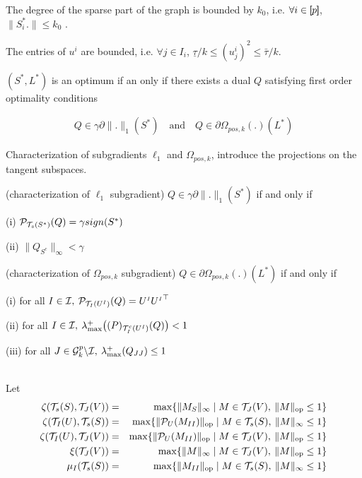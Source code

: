 \documentclass[letterpaper]{article}
\begin{document}
\begin{assumption}The degree of the sparse part of the graph is bounded by $k_0$, i.e. $\forall i\in[\!\![p]\!\!]$,  $\|S^*_i.\|\leq k_0$ .
\end{assumption}

\begin{assumption}The entries of $u^i$ are bounded, i.e. $\forall j\in I_i$,  $\underline{\tau} / k \leq (u_j^i)^2 \leq \bar{\tau} / k$.
\end{assumption}

$(S^*, L^*)$ is an optimum if an only if there exists a dual $Q$ satisfying first order optimality conditions

\begin{align*}
Q\in \gamma \partial \|.\|_1(S^*) \quad \text{and} \quad Q\in \partial \Omega_{pos,k}(.)(L^*)
\end{align*}

Characterization of subgradients $\ell_1$ and $\Omega_{pos,k}$, introduce the projections on the tangent subspaces.

\begin{lemma}(characterization of $\ell_1$ subgradient) $Q\in \gamma \partial \|.\|_1(S^*)$ if and only if
\item[(i)] $\mathcal{P}_{\mathcal{T}_s(S^*)}(Q)=\gamma sign(S^*)$
\item[(ii)] $\|Q_{S^c}\|_{\infty}<\gamma$
\end{lemma}

\begin{lemma}(characterization of $\Omega_{pos,k}$ subgradient) $Q\in \partial \Omega_{pos,k}(.)(L^*)$ if and only if
\item[(i)] for all $I \in \mathcal{I},\:\mathcal{P}_{\mathcal{T}_I(U^{{\scriptscriptstyle I}})}(Q)=U^{{\scriptscriptstyle I}}{U^{{\scriptscriptstyle I}}}^\top$
\item[(ii)] for all $I \in \mathcal{I},\:\lambda_{\max}^+\big (\mathcal(P)_{\mathcal{T}_I^c(U^{{\scriptscriptstyle I}})}(Q) \big )<1$
\item[(iii)] for all $J \in \mathcal{G}^p_k \backslash \mathcal{I}, \: \lambda_{\max}^+(Q_{JJ})\leq 1$
\end{lemma}

\\

Let 
\begin{eqnarray*}
\zeta(\mathcal{T}_s(S),\mathcal{T}_J(V))&=&\max \{ {\|M_S\|_\infty} \mid M \in \mathcal{T}_J(V), \: \|M\|_{{\rm op}}\leq 1\}\\
\zeta(\mathcal{T}_I(U),\mathcal{T}_s(S))&=&\max \{ {\|\mathcal{P}_{U}(M_{II})\|_{{\rm op}}} \mid M \in \mathcal{T}_s(S), \: \|M\|_{\infty}\leq 1\}\\
\zeta(\mathcal{T}_I(U),\mathcal{T}_J(V))&=&\max \{ {\|\mathcal{P}_{U}(M_{II})\|_{{\rm op}}} \mid  M \in \mathcal{T}_J(V), \: \|M\|_{{\rm op}}\leq 1\}\\
\xi(\mathcal{T}_J(V))&=&\max \{ {\|M\|_\infty} \mid M \in \mathcal{T}_J(V), \: \|M\|_{{\rm op}}\leq 1\}\\
\mu_I(\mathcal{T}_s(S))&=&\max \{ {\|M_{II}\|_{\rm op}} \mid M \in \mathcal{T}_s(S), \: \|M\|_{\infty}\leq 1\}\\
\end{eqnarray*}
\end{document}
